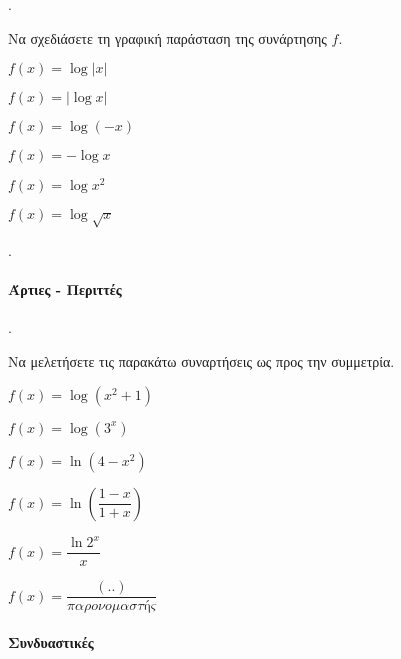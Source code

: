 \documentclass[11pt,a4paper,twocolumn]{article}
\newcounter{askhsh}
\newcommand{\askhsh}{\large\theaskhsh.\ \addtocounter{askhsh}{1}}
\begin{document}
\askhsh Να σχεδιάσετε τη γραφική παράσταση της συνάρτησης $f$.
\begin{multicols}{2}
\begin{alist}
\item $f(x)=\log{|x|}$
\item $f(x)=|\log{x}|$
\item $f(x)=\log{(-x)}$
\item $f(x)=-\log{x}$
\item $f(x)=\log{x^2}$
\item $f(x)=\log{\sqrt{x}}$
\end{alist}
\end{multicols}
\askhsh
\paragraph{Άρτιες - Περιττές}
\askhsh Να μελετήσετε τις παρακάτω συναρτήσεις ως προς την συμμετρία.
\begin{multicols}{2}
\begin{alist}
\item $f(x)=\log{\left(x^2+1\right)}$
\item $f(x)=\log{\left(3^x\right)}$
\item $f(x)=\ln{(4-x^2)}$
\item $f(x)=\ln\left(\dfrac{1-x}{1+x}\right)$
\item $f(x)=\dfrac{\ln{2^x}}{x}$
\item $f(x)=\dfrac{\left(..\right)}{παρονομαστής}$
\end{alist}
\end{multicols}
\paragraph{Συνδυαστικές}
\end{document}
